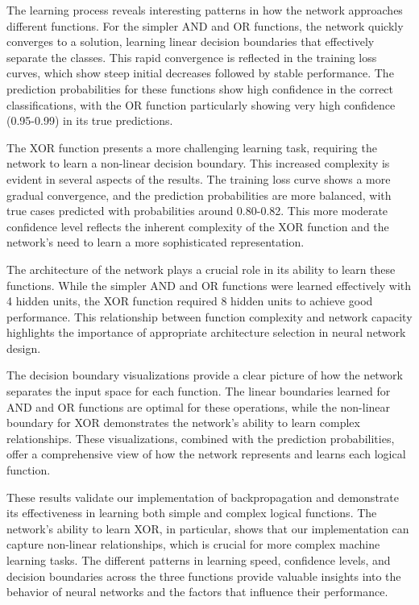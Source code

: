 \documentclass[11pt,a4paper]{article}
\begin{document}
The learning process reveals interesting patterns in how the network approaches different functions. For the simpler AND and OR functions, the network quickly converges to a solution, learning linear decision boundaries that effectively separate the classes. This rapid convergence is reflected in the training loss curves, which show steep initial decreases followed by stable performance. The prediction probabilities for these functions show high confidence in the correct classifications, with the OR function particularly showing very high confidence (0.95-0.99) in its true predictions.

The XOR function presents a more challenging learning task, requiring the network to learn a non-linear decision boundary. This increased complexity is evident in several aspects of the results. The training loss curve shows a more gradual convergence, and the prediction probabilities are more balanced, with true cases predicted with probabilities around 0.80-0.82. This more moderate confidence level reflects the inherent complexity of the XOR function and the network's need to learn a more sophisticated representation.

The architecture of the network plays a crucial role in its ability to learn these functions. While the simpler AND and OR functions were learned effectively with 4 hidden units, the XOR function required 8 hidden units to achieve good performance. This relationship between function complexity and network capacity highlights the importance of appropriate architecture selection in neural network design.

The decision boundary visualizations provide a clear picture of how the network separates the input space for each function. The linear boundaries learned for AND and OR functions are optimal for these operations, while the non-linear boundary for XOR demonstrates the network's ability to learn complex relationships. These visualizations, combined with the prediction probabilities, offer a comprehensive view of how the network represents and learns each logical function.

These results validate our implementation of backpropagation and demonstrate its effectiveness in learning both simple and complex logical functions. The network's ability to learn XOR, in particular, shows that our implementation can capture non-linear relationships, which is crucial for more complex machine learning tasks. The different patterns in learning speed, confidence levels, and decision boundaries across the three functions provide valuable insights into the behavior of neural networks and the factors that influence their performance.
\end{document}
